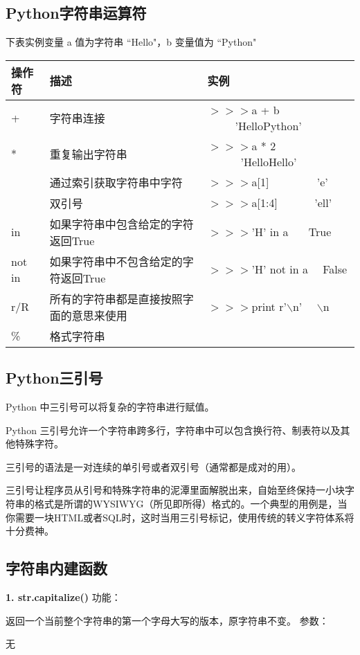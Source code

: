\documentclass{book}
\begin{document}
\begin{CJK}{UTF8}{gbsn}
\subsection{Python字符串运算符}
下表实例变量 a 值为字符串 ``Hello"，b 变量值为 ``Python"
\begin{center}
\begin{tabular}{|l|l|l|}
	\hline 操作符 & 描述 & 实例\\ 	
	\hline + 	 & 字符串连接 &  $>>>$a + b   \ \ \ \ \ 'HelloPython' \\
	\hline *	 & 重复输出字符串 & $>>>$a * 2 \ \ \ \ \ \  'HelloHello' \\
	\hline [\ ]	 & 通过索引获取字符串中字符 & $>>>$a[1] \ \ \ \ \ \ \ \ 'e'\\
	\hline [ : ] & 双引号 & $>>>$a[1:4] \ \ \ \ \ \ 'ell' \\
	\hline in    & 如果字符串中包含给定的字符返回True & $>>>$'H' in a \ 															\ \ True\\
	\hline not in& 如果字符串中不包含给定的字符返回True & $>>>$'H' not in a \ \ False\\
	\hline r/R	 & 所有的字符串都是直接按照字面的意思来使用 & $>>>$print r'$\backslash$n'	 \ \ $\backslash$n	 \\	
	\hline \% 	 & 格式字符串 &   \\
	\hline
\end{tabular}
\end{center}


\subsection{Python三引号}
Python 中三引号可以将复杂的字符串进行赋值。

Python 三引号允许一个字符串跨多行，字符串中可以包含换行符、制表符以及其他特殊字符。

三引号的语法是一对连续的单引号或者双引号（通常都是成对的用）。

三引号让程序员从引号和特殊字符串的泥潭里面解脱出来，自始至终保持一小块字符串的格式是所谓的WYSIWYG（所见即所得）格式的。一个典型的用例是，当你需要一块HTML或者SQL时，这时当用三引号标记，使用传统的转义字符体系将十分费神。

\subsection{字符串内建函数}
\textbf{1. str.capitalize()} \newline
功能：\par 返回一个当前整个字符串的第一个字母大写的版本，原字符串不变。\newline 
参数：\par 无
\newline


\end{CJK}
\end{document}
